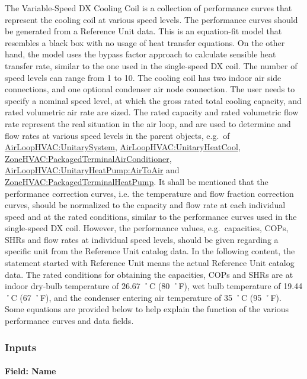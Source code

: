 The Variable-Speed DX Cooling Coil is a collection of performance curves that represent the cooling coil at various speed levels. The performance curves should be generated from a Reference Unit data. This is an equation-fit model that resembles a black box with no usage of heat transfer equations. On the other hand, the model uses the bypass factor approach to calculate sensible heat transfer rate, similar to the one used in the single-speed DX coil. The number of speed levels can range from 1 to 10. The cooling coil has two indoor air side connections, and one optional condenser air node connection. The user needs to specify a nominal speed level, at which the gross rated total cooling capacity, and rated volumetric air rate are sized. The rated capacity and rated volumetric flow rate represent the real situation in the air loop, and are used to determine and flow rates at various speed levels in the parent objects, e.g.~of \hyperref[airloophvacunitarysystem]{AirLoopHVAC:UnitarySystem}, \hyperref[airloophvacunitaryheatcool]{AirLoopHVAC:UnitaryHeatCool}, \hyperref[zonehvacpackagedterminalairconditioner]{ZoneHVAC:PackagedTerminalAirConditioner}, \hyperref[airloophvacunitaryheatpumpairtoair]{AirLoopHVAC:UnitaryHeatPump:AirToAir} and \hyperref[zonehvacpackagedterminalheatpump]{ZoneHVAC:PackagedTerminalHeatPump}. It shall be mentioned that the performance correction curves, i.e. the temperature and flow fraction correction curves, should be normalized to the capacity and flow rate at each individual speed and at the rated conditions, similar to the performance curves used in the single-speed DX coil. However, the performance values, e.g.~capacities, COPs, SHRs and flow rates at individual speed levels, should be given regarding a specific unit from the Reference Unit catalog data. In the following content, the statement started with Reference Unit means the actual Reference Unit catalog data. The rated conditions for obtaining the capacities, COPs and SHRs are at indoor dry-bulb temperature of 26.67 ˚C (80 ˚F), wet bulb temperature of 19.44 ˚C (67 ˚F), and the condenser entering air temperature of 35 ˚C (95 ˚F). Some equations are provided below to help explain the function of the various performance curves and data fields.

\subsubsection{Inputs}\label{inputs-17-001}

\paragraph{Field: Name}\label{field-name-16-002}

